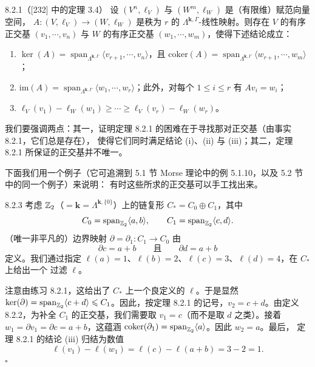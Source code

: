 \begin{wthm}{8.2.1}（[232] 中的定理 3.4）
  设 $(V^n,\ell_V)$ 与 $(W^m,\ell_W)$ 是（有限维）赋范向量空间，
  $A\colon(V,\ell_V)\to(W,\ell_W)$ 是秩为 $r$ 的 $\Lambda^{\mathbf{k},\Gamma}$-线性映射。则存在
  $V$ 的有序正交基 $(v_1,\cdots,v_n)$ 与 $W$ 的有序正交基 $(w_1,\cdots,w_m)$，使得下述结论成立：
  \begin{enumerate}[label=(\roman*)]
    \item $\ker(A)=\operatorname{span}_{\Lambda^{\mathbf{k},\Gamma}}
          \langle v_{r+1},\cdots,v_n\rangle$，且
          $\mathrm{coker}(A)=\operatorname{span}_{\Lambda^{\mathbf{k},\Gamma}}
          \langle w_{r+1},\cdots,w_m\rangle$；
    \item $\mathrm{im}(A)=\operatorname{span}_{\Lambda^{\mathbf{k},\Gamma}}
          \langle w_1,\cdots,w_r\rangle$；此外，对每个 $1\leqslant i\leqslant r$ 有
          $Av_i=w_i$；
    \item $\ell_V(v_1)-\ell_W(w_1)\geqslant\cdots\geqslant\ell_V(v_r)-\ell_W(w_r)$。
  \end{enumerate}
\end{wthm}

我们要强调两点：其一，证明定理 8.2.1 的困难在于寻找那对正交基（由事实 8.2.1，它们总是存在），
使得它们同时满足结论 (i)、(ii) 与 (iii)；其二，定理 8.2.1 所保证的正交基并不唯一。

下面我们用一个例子（它可追溯到 5.1 节 Morse 理论中的例 5.1.10，以及 5.2 节中的同一个例子）来说明：
有时这些所求的正交基可以手工找出来。

\begin{wexam}{8.2.3}
  考虑 $\mathbb{Z}_2$（$=\mathbf{k}=\Lambda^{\mathbf{k},\{0\}}$）上的链复形
  $C_*=C_0\oplus C_1$，其中
  \[
    C_0=\operatorname{span}_{\mathbb{Z}_2}\langle a,b\rangle,\qquad
    C_1=\operatorname{span}_{\mathbb{Z}_2}\langle c,d\rangle.
  \]
  （唯一非平凡的）边界映射 $\partial=\partial_1\colon C_1\to C_0$ 由
  \begin{equation}\tag{8.14}
    \partial c=a+b\qquad\text{且}\qquad\partial d=a+b
  \end{equation}
  定义。我们通过指定 $\ell(a)=1$、$\ell(b)=2$、$\ell(c)=3$、$\ell(d)=4$，在 $C_*$ 上给出一个
  过滤 $\ell$。

  注意由练习 8.2.1，这给出了 $C_*$ 上一个良定义的 $\ell$。于是显然
  $\ker(\partial)=\operatorname{span}_{\mathbb{Z}_2}\langle c+d\rangle\leqslant C_1$。因此，按定理 8.2.1
  的记号，$v_2=c+d$。由定义 8.2.2，为补全 $C_1$ 的正交基，我们需要取 $v_1=c$（而不是取 $d$
  之类）。接着 $w_1=\partial v_1=\partial c=a+b$，这蕴涵
  $\mathrm{coker}(\partial_1)=\operatorname{span}_{\mathbb{Z}_2}\langle a\rangle$。因此 $w_2=a$。最后，
  定理 8.2.1 的结论 (iii) 归结为数值
  \[
    \ell(v_1)-\ell(w_1)=\ell(c)-\ell(a+b)=3-2=1.
  \]
  \hfill$\square$
\end{wexam}

